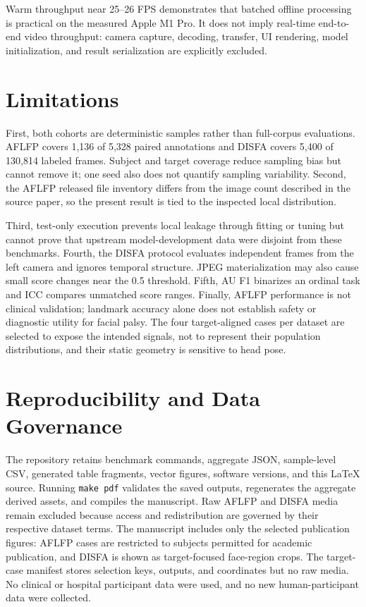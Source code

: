 \documentclass[10pt,journal]{IEEEtran}
\newcommand{\code}[1]{\texttt{#1}}
\begin{document}
Warm throughput near 25--26 FPS demonstrates that batched offline processing
is practical on the measured Apple M1 Pro. It does not imply real-time
end-to-end video throughput: camera capture, decoding, transfer, UI rendering,
model initialization, and result serialization are explicitly excluded.

\section{Limitations}

First, both cohorts are deterministic samples rather than full-corpus
evaluations. AFLFP covers 1,136 of 5,328 paired annotations and DISFA covers
5,400 of 130,814 labeled frames. Subject and target coverage reduce sampling
bias but cannot remove it; one seed also does not quantify sampling
variability. Second, the AFLFP released file inventory differs from the image
count described in the source paper, so the present result is tied to the
inspected local distribution.

Third, test-only execution prevents local leakage through fitting or tuning
but cannot prove that upstream model-development data were disjoint from
these benchmarks. Fourth, the DISFA protocol evaluates independent frames
from the left camera and ignores temporal structure. JPEG materialization may
also cause small score changes near the 0.5 threshold. Fifth, AU F1
binarizes an ordinal task and ICC compares unmatched score ranges. Finally,
AFLFP performance is not clinical validation; landmark accuracy alone does
not establish safety or diagnostic utility for facial palsy. The four
target-aligned cases per dataset are selected to expose the intended signals,
not to represent their population distributions, and their static geometry
is sensitive to head pose.

\section{Reproducibility and Data Governance}

The repository retains benchmark commands, aggregate JSON, sample-level CSV,
generated table fragments, vector figures, software versions, and this
LaTeX source. Running \code{make pdf} validates the saved outputs, regenerates
the aggregate derived assets, and compiles the manuscript. Raw AFLFP and
DISFA media remain excluded because access and redistribution are governed by
their respective dataset terms. The manuscript includes only the selected
publication figures: AFLFP cases are restricted to subjects permitted for
academic publication, and DISFA is shown as target-focused face-region crops.
The target-case manifest stores selection keys, outputs, and coordinates but
no raw media. No clinical or hospital participant data were used, and no new
human-participant data were collected.
\end{document}
